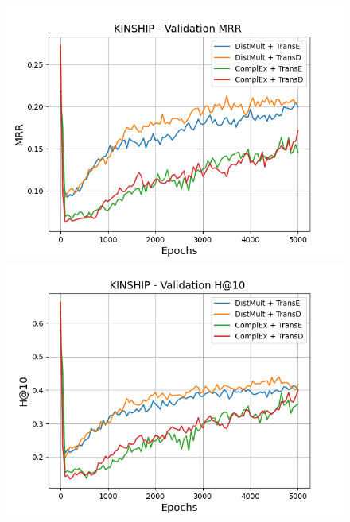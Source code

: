 \begin{figure}
    \centering
    \begin{minipage}{.45\textwidth}
      \centering
      \includegraphics[width=0.9\linewidth]{figures/results/gan_train/pretrained/uncertainty/max/entropy/kinship/5k_epochs/uncertainty_kinship_mrrs.png}
    \end{minipage}%
    \begin{minipage}{.45\textwidth}
      \centering
      \includegraphics[width=0.9\linewidth]{figures/results/gan_train/pretrained/uncertainty/max/entropy/kinship/5k_epochs/uncertainty_kinship_hit10.png}
    \end{minipage}
    

\end{figure}
